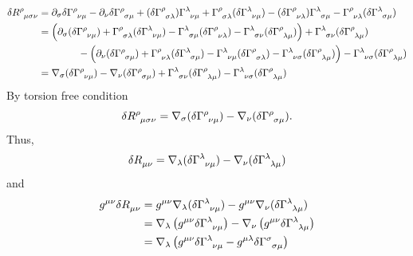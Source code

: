 \documentclass{article}
\theoremstyle{definition}
\def\t{\tensor}
\begin{document}
\begin{align}
    \delta \t{R}{^\rho_\mu_\sigma_\nu} &= \partial_\sigma \delta \t{\Gamma}{^\rho_\nu_\mu} - \partial_\nu \delta \t{\Gamma}{^\rho_\sigma_\mu} + (\delta \t{\Gamma}{^\rho_\sigma_\lambda} ) \t{\Gamma}{^\lambda_\nu_\mu} + \t{\Gamma}{^\rho_\sigma_\lambda} (\delta \t{\Gamma}{^\lambda_\nu_\mu}) - (\delta \t{\Gamma}{^\rho_\nu_\lambda}) \t{\Gamma}{^\lambda_\sigma_\mu} - \t{\Gamma}{^\rho_\nu_\lambda} (\delta \t{\Gamma}{^\lambda_\sigma_\mu}) \\
                                       &= \left(\partial_\sigma (\delta \t{\Gamma}{^\rho_\nu_\mu}) + \t{\Gamma}{^\rho_\sigma_\lambda} (\delta \t{\Gamma}{^\lambda_\nu_\mu}) - \t{\Gamma}{^\lambda_\sigma_\mu} (\delta \t{\Gamma}{^\rho_\nu_\lambda}) - \t{\Gamma}{^\lambda_\sigma_\nu} (\delta \t{\Gamma}{^\rho_\lambda_\mu}) \right) + \t{\Gamma}{^\lambda_\sigma_\nu} (\delta \t{\Gamma}{^\rho_\lambda_\mu}) \nonumber\\ 
                                       & \qquad \qquad - \left( \partial_\nu (\delta \t{\Gamma}{^\rho_\sigma_\mu}) +\t{\Gamma}{^\rho_\nu_\lambda} (\delta \t{\Gamma}{^\lambda_\sigma_\mu}) - \t{\Gamma}{^\lambda_\nu_\mu} (\delta \t{\Gamma}{^\rho_\sigma_\lambda}) - \t{\Gamma}{^\lambda_\nu_\sigma} (\delta \t{\Gamma}{^\rho_\lambda_\mu}) \right) - \t{\Gamma}{^\lambda_\nu_\sigma} (\delta \t{\Gamma}{^\rho_\lambda_\mu}) \\
                                       &= \nabla_\sigma (\delta \t{\Gamma}{^\rho_\nu_\mu}) - \nabla_\nu (\delta \t{\Gamma}{^\rho_\sigma_\mu}) + \t{\Gamma}{^\lambda_\sigma_\nu} (\delta \t{\Gamma}{^\rho_\lambda_\mu}) - \t{\Gamma}{^\lambda_\nu_\sigma} (\delta \t{\Gamma}{^\rho_\lambda_\mu})
\end{align}
By torsion free condition
\begin{equation}
    \delta \t{R}{^\rho_\mu_\sigma_\nu} = \nabla_\sigma (\delta \t{\Gamma}{^\rho_\nu_\mu}) - \nabla_\nu (\delta \t{\Gamma}{^\rho_\sigma_\mu}).
\end{equation}
Thus,
\begin{equation}
    \delta \t{R}{_\mu_\nu} = \nabla_\lambda (\delta \t{\Gamma}{^\lambda_\nu_\mu}) - \nabla_\nu (\delta \t{\Gamma}{^\lambda_\lambda_\mu} )
\end{equation}
and
\begin{align}
    g^{\mu\nu} \delta \t{R}{_\mu_\nu} &= g^{\mu\nu} \nabla_\lambda (\delta \t{\Gamma}{^\lambda_\nu_\mu}) - g^{\mu\nu} \nabla_\nu (\delta \t{\Gamma}{^\lambda_\lambda_\mu} ) \\
                                      &= \nabla_\lambda \left( g^{\mu\nu} \delta \t{\Gamma}{^\lambda_\nu_\mu} \right) - \nabla_\nu \left( g^{\mu\nu} \delta \t{\Gamma}{^\lambda_\lambda_\mu} \right) \\
                                      &= \nabla_\lambda \left( g^{\mu\nu} \delta \t{\Gamma}{^\lambda_\nu_\mu}  -  g^{\mu\lambda} \delta \t{\Gamma}{^\sigma_\sigma_\mu} \right)
\end{align}
\end{document}
